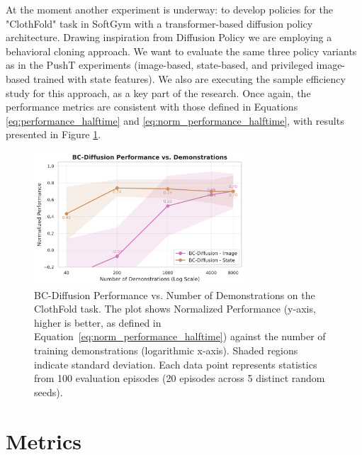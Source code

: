 \documentclass{article}
\begin{document}
 At the moment another experiment is underway: to develop policies for the "ClothFold" task in SoftGym \cite{lin2021softgym} with a transformer-based diffusion policy architecture.
Drawing inspiration from Diffusion Policy \cite{chi2023diffusionpolicy} we are employing a behavioral cloning approach. We want to evaluate the same three policy variants as in the PushT experiments (image-based, state-based, and privileged image-based trained with state features).
We also are executing the sample efficiency study for this approach, as a key part of the research.
Once again, the performance metrics are consistent with those defined in Equations \eqref{eq:performance_halftime} and \eqref{eq:norm_performance_halftime}, with results presented in Figure \ref{fig:bcdiff_clothfold_efficiency}.

\begin{figure}[htbp]
    \centering
    \includegraphics[width=0.7\textwidth]{./media/bc_diffusion_performance_vs_num_dems.png}
    \caption{BC-Diffusion Performance vs. Number of Demonstrations on the ClothFold task. The plot shows Normalized Performance (y-axis, higher is better, as defined in Equation~\eqref{eq:norm_performance_halftime}) against the number of training demonstrations (logarithmic x-axis). Shaded regions indicate standard deviation. Each data point represents statistics from 100 evaluation episodes (20 episodes across 5 distinct random seeds).}
    \label{fig:bcdiff_clothfold_efficiency}
\end{figure}

\section*{Metrics}
\end{document}
